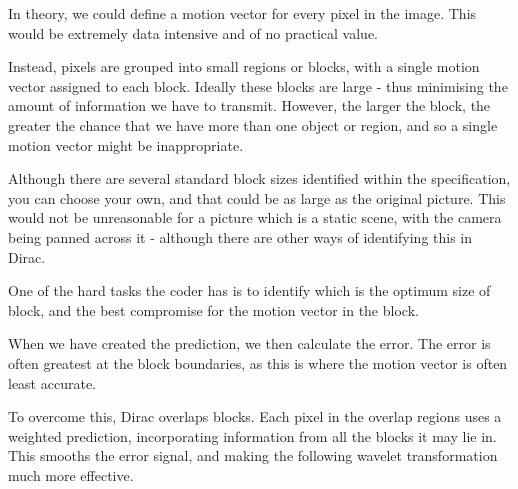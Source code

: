In theory, we could define a motion vector for every pixel in the image.
This would be extremely data intensive and of no practical value.

Instead, pixels are grouped into small regions or blocks, with a single
motion vector assigned to each block. Ideally these blocks are large -
thus minimising the amount of information we have to transmit. However,
the larger the block, the greater the chance that we have more than one
object or region, and so a single motion vector might be inappropriate.

Although there are several standard block sizes identified within the
specification, you can choose your own, and that could be as large as
the original picture. This would not be unreasonable for a picture which
is a static scene, with the camera being panned across it - although
there are other ways of identifying this in Dirac.

One of the hard tasks the coder has is to identify which is the optimum
size of block, and the best compromise for the motion vector in the
block.

When we have created the prediction, we then calculate the error. The
error is often greatest at the block boundaries, as this is where the
motion vector is often least accurate.

To overcome this, Dirac overlaps blocks. Each pixel in the overlap
regions uses a weighted prediction, incorporating information from all
the blocks it may lie in. This smooths the error signal, and making the
following wavelet transformation much more effective.
